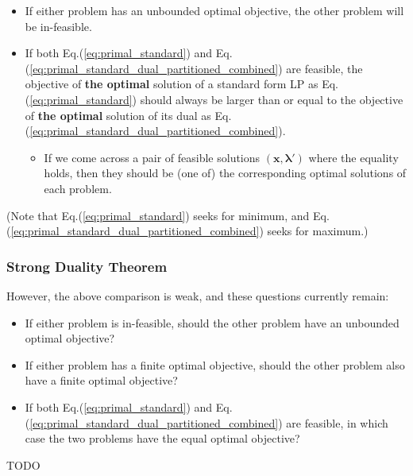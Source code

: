 \documentclass[twocolumn]{ctexart}
\begin{document}
\begin{itemize}
    \item
    If either problem has an unbounded optimal objective,
    the other problem will be in-feasible.
    \item
    If both Eq.(\ref{eq:primal_standard}) and Eq.(\ref{eq:primal_standard_dual_partitioned_combined}) are feasible,
    the objective of \textbf{the optimal} solution of a standard form LP as Eq.(\ref{eq:primal_standard})
    should always be larger than or equal to
    the objective of \textbf{the optimal} solution of its dual as Eq.(\ref{eq:primal_standard_dual_partitioned_combined}).
    \begin{itemize}
        \item
        If we come across a pair of feasible solutions $(\mathbf{x}, \mathbf{\lambda}')$ where the equality holds,
        then they should be (one of) the corresponding optimal solutions of each problem.
    \end{itemize}
\end{itemize}
(Note that Eq.(\ref{eq:primal_standard}) seeks for minimum, and Eq.(\ref{eq:primal_standard_dual_partitioned_combined}) seeks for maximum.)



\subsubsection{Strong Duality Theorem}

However,
the above comparison is weak, and
these questions currently remain:
\begin{itemize}
    \item
    If either problem is in-feasible,
    should the other problem have an unbounded optimal objective?
    \item
    If either problem has a finite optimal objective,
    should the other problem also have a finite optimal objective?
    \item
    If both Eq.(\ref{eq:primal_standard}) and Eq.(\ref{eq:primal_standard_dual_partitioned_combined}) are feasible,
    in which case the two problems have the equal optimal objective?
\end{itemize}

TODO


\begin{equation}
    \begin{aligned}
    \end{aligned}
\end{equation}




\begin{equation}
    \begin{aligned}
    \end{aligned}
\end{equation}
\end{document}
